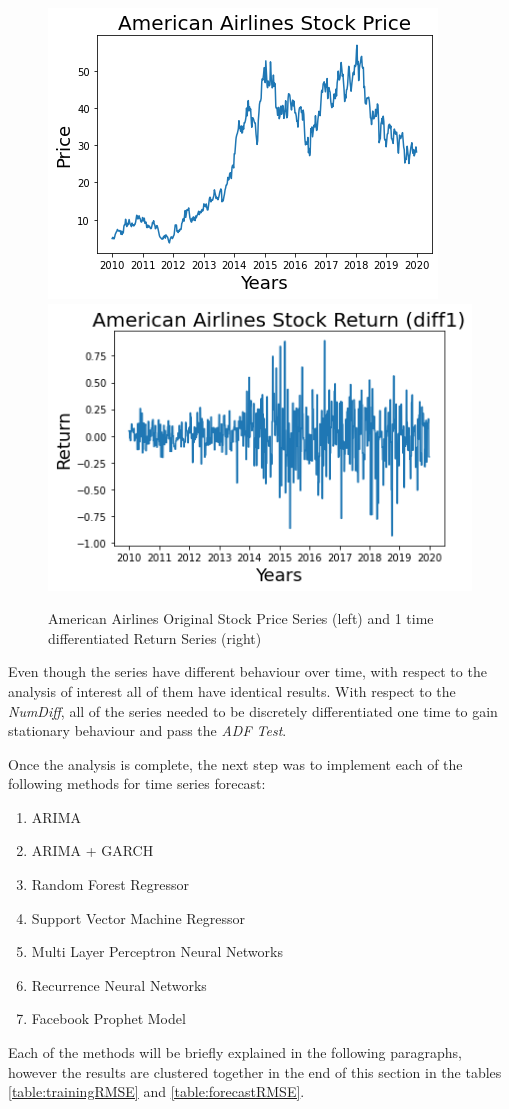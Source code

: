 \documentclass[10pt,twocolumn,letterpaper]{article}
\begin{document}
\begin{figure}[h]
	\centering
	\includegraphics[width=0.45\linewidth]{../img/SeriesAnalysis/American_Serie}
	\includegraphics[width=0.45\linewidth]{../img/SeriesAnalysis/American_diffSerie}
	\caption{American Airlines Original Stock Price Series (left) and 1 time differentiated Return Series (right)}
	\label{fig:americanserie}
\end{figure}


Even though the series have different behaviour over time, with respect to the analysis of interest all of them have identical results. With respect to the \textit{NumDiff}, all of the series needed to be discretely differentiated one time to gain stationary behaviour and pass the \textit{ADF Test}. 

Once the analysis is complete, the next step was to implement each of the following methods for time series forecast:
\begin{enumerate}
	\item ARIMA
	\item ARIMA + GARCH
	\item Random Forest Regressor
	\item Support Vector Machine Regressor
	\item Multi Layer Perceptron Neural Networks
	\item Recurrence Neural Networks
	\item Facebook Prophet Model
\end{enumerate}

Each of the methods will be briefly explained in the following paragraphs, however the results are clustered together in the end of this section in the tables \ref{table:trainingRMSE} and \ref{table:forecastRMSE}.\\
\end{document}
